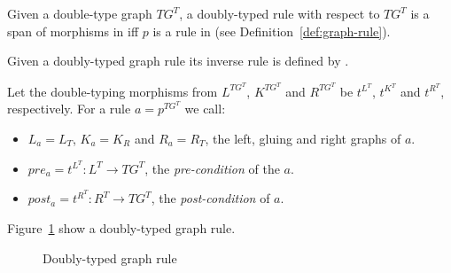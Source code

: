 \begin{definition} Given a double-type graph $TG^T$, a doubly-typed rule with respect to $TG^T$ is a span of morphisms \doublyTypedRule{} in \doublyTypedGraphCategory{} iff $p$ is a rule in \typedGraphCategory{} (see Definition~\ref{def:graph-rule}). 
  

  Given a doubly-typed graph rule \doublyTypedRule{} its inverse rule is defined by \inverseDoublyTypedRule{}.

  Let the double-typing morphisms from $L^{TG^T}$, $K^{TG^T}$ and $R^{TG^T}$ be $t^{L^T}$, $t^{K^T}$ and $t^{R^T}$, respectively. For a rule $a = p^{TG^T}$ we call:

  \begin{itemize}
    \item $L_a = L_T$, $K_a = K_R$ and $R_a = R_T$, the left, gluing and right graphs of $a$.
    \item $pre_a = t^{L^T} : L^T \rightarrow TG^T$, the \emph{pre-condition} of the $a$.
    \item $post_a = t^{R^T} : R^T \rightarrow TG^T$, the \emph{post-condition} of $a$.
  \end{itemize}

\end{definition}

\begin{example}Figure~\ref{fig:process:doubly-typed-graph-rule} show a doubly-typed graph rule.

\begin{figure}[!ht]
  \centering
  \caption{Doubly-typed graph rule}\label{fig:process:doubly-typed-graph-rule}
\end{figure}
\end{example}

